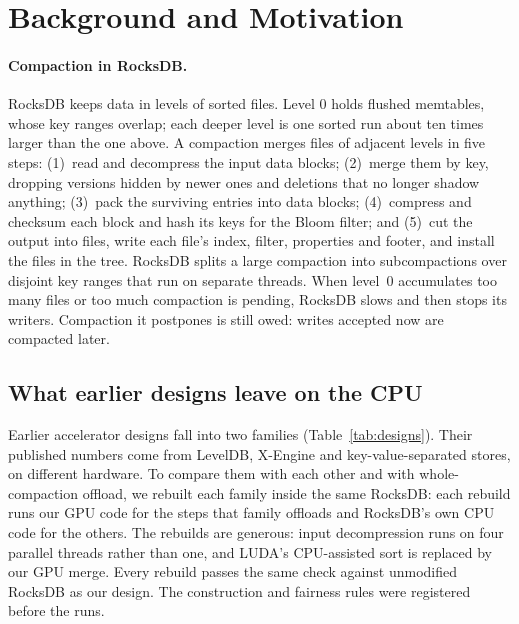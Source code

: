 \documentclass[sigconf, nonacm]{acmart}
\begin{document}
\section{Background and Motivation}
\label{sec:background}

\paragraph{Compaction in RocksDB.} RocksDB keeps data in levels of sorted files. Level 0
holds flushed memtables, whose key ranges overlap; each deeper level is one sorted run about
ten times larger than the one above. A compaction merges files of adjacent levels in five
steps: (1)~read and decompress the input data blocks; (2)~merge them by key, dropping versions
hidden by newer ones and deletions that no longer shadow anything; (3)~pack the surviving
entries into data blocks; (4)~compress and checksum each block and hash its keys for the Bloom
filter; and (5)~cut the output into files, write each file's index, filter, properties and
footer, and install the files in the tree. RocksDB splits a large compaction into
subcompactions over disjoint key ranges that run on separate threads. When level~0 accumulates
too many files or too much compaction is pending, RocksDB slows and then stops its writers.
Compaction it postpones is still owed: writes accepted now are compacted later.

\subsection{What earlier designs leave on the CPU}
\label{sec:motivation}

Earlier accelerator designs fall into two families (Table~\ref{tab:designs}). Their published
numbers come from LevelDB, X-Engine and key-value-separated stores, on different hardware.
To compare them with each other and with whole-compaction offload, we rebuilt each family
inside the same RocksDB: each rebuild runs our GPU code for the steps that family offloads and
RocksDB's own CPU code for the others. The rebuilds are generous: input decompression runs on
four parallel threads rather than one, and LUDA's CPU-assisted sort is replaced by our GPU
merge. Every rebuild passes the same check against unmodified RocksDB as our design. The
construction and fairness rules were registered before the runs.
\end{document}
